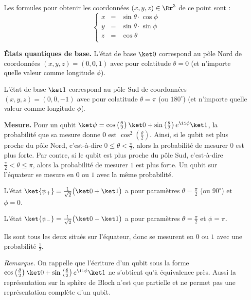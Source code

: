 \documentclass[11pt,class=report,crop=false]{standalone}
\renewcommand{\commentfigure}[1]{#1} %
\begin{document}
Les formules pour obtenir les coordonnées $(x,y,z)\in\Rr^3$ de ce point sont :
$$\left\{\begin{array}{rcl}
x &=& \sin\theta \cdot \cos\phi \\
y &=& \sin\theta \cdot \sin\phi \\
z &=& \cos\theta \\
\end{array}\right.$$


\bigskip
\textbf{États quantiques de base.}
L'état de base $\ket0$ correspond au pôle Nord de coordonnées $(x,y,z)= (0,0,1)$ avec pour colatitude $\theta=0$ (et n'importe quelle valeur comme longitude $\phi$).
 \commentfigure{ 
\myfigure{0.8}{
\tikzinput{bloch02a}\qquad\qquad
\tikzinput{bloch02b}
}  
}
L'état de base $\ket1$ correspond au pôle Sud de coordonnées $(x,y,z)= (0,0,-1)$ avec pour colatitude $\theta=\pi$ (ou $180^\circ$) (et n'importe quelle valeur comme longitude $\phi$).
 
\bigskip
\textbf{Mesure.}
Pour un qubit $\ket\psi = \cos\left(\frac\theta2\right)\ket0+ \sin\left(\frac\theta2\right)e^{\ii\phi}\ket1$, la probabilité que sa mesure donne $0$ est
$\cos^2(\frac\theta2)$. 
Ainsi, si le qubit est plus proche du pôle Nord, c'est-à-dire $0 \le \theta < \frac\pi2$, alors la probabilité de mesurer $0$ est plus forte.
Par contre, si le qubit est plus proche du pôle Sud, c'est-à-dire $\frac\pi2 < \theta \le  \pi$, alors la probabilité de mesurer $1$ est plus forte.
Un qubit sur l'équateur se mesure en $0$ ou $1$ avec la même probabilité.



\begin{exemple}
L'état $\ket{\psi_+} = \frac1{\sqrt2} \big(\ket0+\ket1\big)$ a pour paramètres
$\theta = \frac\pi2$ (ou $90^\circ$) et $\phi=0$. 
  
  
  L'état $\ket{\psi_-} = \frac1{\sqrt2} \big(\ket0-\ket1\big)$ a pour paramètres
   $\theta = \frac\pi2$ et $\phi=\pi$.
    
   \commentfigure{
   }
Ils sont tous les deux situés sur l'équateur, donc se mesurent en $0$ ou $1$ avec une probabilité $\frac12$.
\end{exemple}


\emph{Remarque.} On rappelle que l'écriture d'un qubit sous la forme $ \cos\left(\frac\theta2\right)\ket0+ \sin\left(\frac\theta2\right)e^{\ii\phi}\ket1$ ne s'obtient qu'à équivalence près. Aussi la représentation sur la sphère de Bloch n'est que partielle et ne permet pas une représentation complète d'un qubit.
\end{document}
